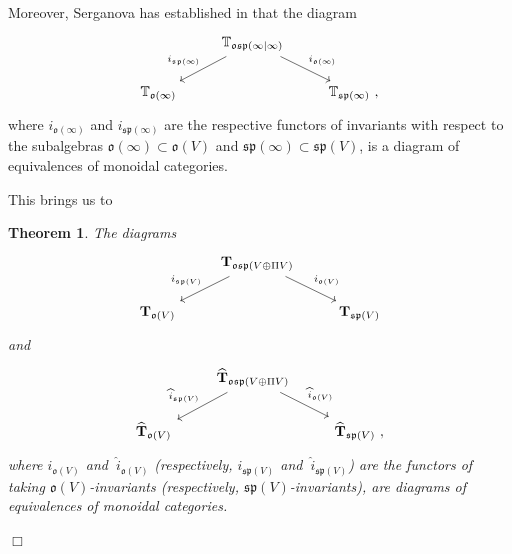 \documentclass[12pt,reqno]{amsart}
\newtheorem{thm}{Theorem}[section]
\theoremstyle{definition}
\theoremstyle{remark}
\begin{document}
Moreover, Serganova has established in \cite{S} that the diagram 
\begin{equation}
\label{eq4}
\begin{tikzcd}
    & \mathbb{T}_{\mathfrak{osp}(\infty | \infty)} \arrow[dl, "i_{\mathfrak{sp}(\infty)}"'] \arrow[dr, "i_{\mathfrak{o}(\infty)}"]& \\
    \mathbb{T}_{\mathfrak{o}(\infty)} & & \mathbb{T}_{\mathfrak{sp}(\infty)} \ ,
\end{tikzcd}  
\end{equation}
where $i_{\mathfrak{o}(\infty)}$ and $i_{\mathfrak{sp}(\infty)}$ are the respective functors of invariants with respect to the subalgebras $\mathfrak{o}(\infty) \subset \mathfrak{o}(V)$ and $\mathfrak{sp}(\infty) \subset \mathfrak{sp}(V)$, is a diagram of equivalences of monoidal categories.

This brings us to
\begin{thm}
    The diagrams
    \begin{equation}
\label{eq5}
\begin{tikzcd}
    & \mathbf{T}_{\mathfrak{osp}(V \oplus \Pi V)} \arrow[dl, "i_{\mathfrak{sp}(V)}"'] \arrow[dr, "i_{\mathfrak{o}(V)}"]& \\
    \mathbf{T}_{\mathfrak{o}(V)} & & \mathbf{T}_{\mathfrak{sp}(V)}
\end{tikzcd}  
\end{equation}
and
\begin{equation}
\label{eq6}
\begin{tikzcd}
    & \widehat{\mathbf{T}}_{\mathfrak{osp}(V \oplus \Pi V)} \arrow[dl, "\widehat{i}_{\mathfrak{sp}(V)}"'] \arrow[dr, "\widehat{i}_{\mathfrak{o}(V)}"]& \\
    \widehat{\mathbf{T}}_{\mathfrak{o}(V)}& & \widehat{\mathbf{T}}_{\mathfrak{sp}(V)} \ ,
\end{tikzcd}  
\end{equation}
where $i_{\mathfrak{o}(V)}$ and $\ \widehat{i}_{\mathfrak{o}(V)}$ (respectively, $i_{\mathfrak{sp}(V)}$ and $\ \widehat{i}_{\mathfrak{sp}(V)}$) are the functors of taking $\mathfrak{o}(V)$-invariants (respectively, $\mathfrak{sp}(V)$-invariants), are diagrams of equivalences of monoidal categories.
\end{thm}
\begin{flushright}
$\Box$
\end{flushright}
\end{document}
